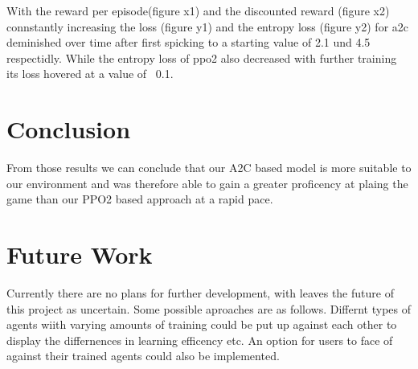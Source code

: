 \documentclass[sigconf]{acmart}
\begin{document}
With the reward per episode(figure x1) and the discounted reward (figure x2) connstantly increasing the loss (figure y1) and the entropy loss (figure y2) for a2c deminished over time after first spicking to a starting value of 2.1 und 4.5 respectidly. While the entropy loss of ppo2 also decreased with further training its loss hovered at a value of ~0.1.



\section{Conclusion}
 From those results we can conclude that our A2C based model is more suitable to our environment and was therefore able to gain a greater proficency at plaing the game than our PPO2 based approach at a rapid pace. 
  
\section{Future Work}
Currently there are no plans for further development, with leaves the future of  this project as uncertain. Some possible aproaches are as follows. 
Differnt types of agents wiith varying amounts of training could be put up against each other to display the differnences in learning efficency etc. An option for users to face of against their trained agents could also be implemented.
\end{document}
